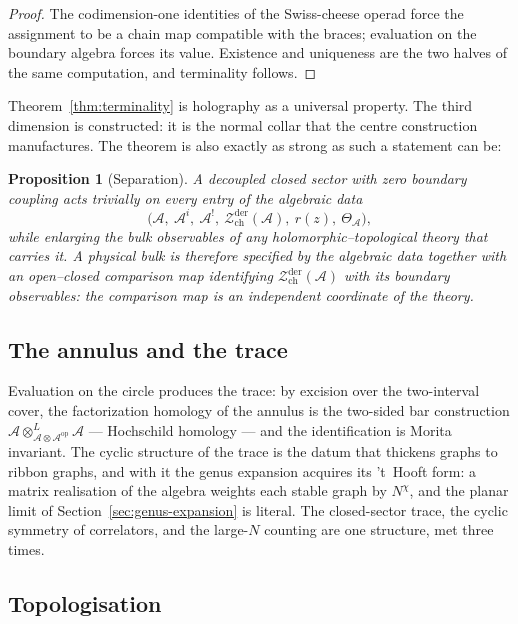 \documentclass[11pt]{amsart}
\numberwithin{equation}{section}
\theoremstyle{plain}
\newtheorem{proposition}[theorem]{Proposition}
\theoremstyle{definition}
\theoremstyle{remark}
\newcommand{\cA}{\mathcal{A}}
\newcommand{\cZ}{\mathcal{Z}}
\begin{document}
\begin{proof}
The codimension-one identities of the Swiss-cheese operad force the
assignment to be a chain map compatible with the braces; evaluation on
the boundary algebra forces its value. Existence and uniqueness are the
two halves of the same computation, and terminality follows.
\end{proof}

Theorem~\ref{thm:terminality} is holography as a universal property. The
third dimension is constructed: it is the normal collar that the
centre construction manufactures. The theorem is also exactly as strong
as such a statement can be:

\begin{proposition}[Separation]\label{prop:separation}
A decoupled closed sector with zero boundary coupling acts trivially
on every entry of the algebraic data
\[
\bigl(\cA,\ \cA^{i},\ \cA^{!},\
\cZ^{\mathrm{der}}_{\mathrm{ch}}(\cA),\ r(z),\ \Theta_{\cA}\bigr),
\]
while enlarging the bulk observables of any holomorphic--topological theory
that carries it. A physical bulk is therefore specified by the
algebraic data together with an open--closed comparison map
identifying $\cZ^{\mathrm{der}}_{\mathrm{ch}}(\cA)$ with its boundary
observables: the comparison map is an independent coordinate of the
theory.
\end{proposition}

\subsection{The annulus and the trace}

Evaluation on the circle produces the trace: by excision over the
two-interval cover, the factorization homology of the annulus is the
two-sided bar construction
$\cA\otimes^{L}_{\cA\otimes\cA^{\mathrm{op}}}\cA$ --- Hochschild
homology --- and the identification is Morita invariant. The cyclic
structure of the trace is the datum that thickens graphs to ribbon
graphs, and with it the genus expansion acquires its 't~Hooft form:
a matrix realisation of the algebra weights each stable graph by
$N^{\chi}$, and the planar limit of Section~\ref{sec:genus-expansion}
is literal. The closed-sector trace, the cyclic symmetry of
correlators, and the large-$N$ counting are one structure, met three
times.

\subsection{Topologisation}
\end{document}
